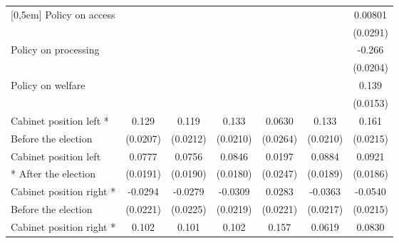 \begin{table}[htbp]
\begin{tabular}{l*{6}{c}}
[0,5em]
Policy on access    &                     &                     &                     &                     &                     &     0.00801         \\
                    &                     &                     &                     &                     &                     &    (0.0291)         \\
[0,5em]
Policy on processing&                     &                     &                     &                     &                     &      -0.266\sym{***}\\
                    &                     &                     &                     &                     &                     &    (0.0204)         \\
[0,5em]
Policy on welfare   &                     &                     &                     &                     &                     &       0.139\sym{***}\\
                    &                     &                     &                     &                     &                     &    (0.0153)         \\
[0,5em]
Cabinet position left *&       0.129\sym{***}&       0.119\sym{***}&       0.133\sym{***}&      0.0630\sym{*}  &       0.133\sym{***}&       0.161\sym{***}\\
   Before the election                  &    (0.0207)         &    (0.0212)         &    (0.0210)         &    (0.0264)         &    (0.0210)         &    (0.0215)         \\
[0,5em]
Cabinet position left &      0.0777\sym{***}&      0.0756\sym{***}&      0.0846\sym{***}&      0.0197         &      0.0884\sym{***}&      0.0921\sym{***}\\
* After the election                    &    (0.0191)         &    (0.0190)         &    (0.0180)         &    (0.0247)         &    (0.0189)         &    (0.0186)         \\
[0,5em]
Cabinet position right *&     -0.0294         &     -0.0279         &     -0.0309         &      0.0283         &     -0.0363         &     -0.0540\sym{*}  \\
 Before the election                    &    (0.0221)         &    (0.0225)         &    (0.0219)         &    (0.0221)         &    (0.0217)         &    (0.0215)         \\
[0,5em]
Cabinet position right *&       0.102\sym{**} &       0.101\sym{**} &       0.102\sym{**} &       0.157\sym{***}&      0.0619         &      0.0830\sym{*}  \\

\end{tabular}
\end{table}
